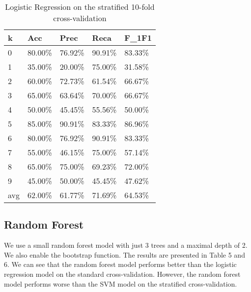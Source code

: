 \documentclass{article}
\begin{document}
\begin{table}[h!]
	\centering
	\caption{Logistic Regression on the stratified 10-fold cross-validation}
	\begin{tabular}{|l|l|l|l|l|}
	\hline
	\textbf{k} & \textbf{Acc} & \textbf{Prec} & \textbf{Reca} & \textbf{F\_1F1} \\ \hline
	0          & 80.00\%      & 76.92\%       & 90.91\%       & 83.33\%         \\ \hline
	1          & 35.00\%      & 20.00\%       & 75.00\%       & 31.58\%         \\ \hline
	2          & 60.00\%      & 72.73\%       & 61.54\%       & 66.67\%         \\ \hline
	3          & 65.00\%      & 63.64\%       & 70.00\%       & 66.67\%         \\ \hline
	4          & 50.00\%      & 45.45\%       & 55.56\%       & 50.00\%         \\ \hline
	5          & 85.00\%      & 90.91\%       & 83.33\%       & 86.96\%         \\ \hline
	6          & 80.00\%      & 76.92\%       & 90.91\%       & 83.33\%         \\ \hline
	7          & 55.00\%      & 46.15\%       & 75.00\%       & 57.14\%         \\ \hline
	8          & 65.00\%      & 75.00\%       & 69.23\%       & 72.00\%         \\ \hline
	9          & 45.00\%      & 50.00\%       & 45.45\%       & 47.62\%         \\ \hline
	avg        & 62.00\%      & 61.77\%       & 71.69\%       & 64.53\%         \\ \hline
	\end{tabular}
\end{table}



\subsection*{Random Forest}

We use a small random forest model with just 3 trees and a maximal depth of 2. We also enable the bootstrap function. The results are presented in Table 5 and 6. We can see that the random forest model performs better than the logistic regression model on the standard cross-validation. However, the random forest model performs worse than the SVM model on the stratified cross-validation. 
\end{document}
